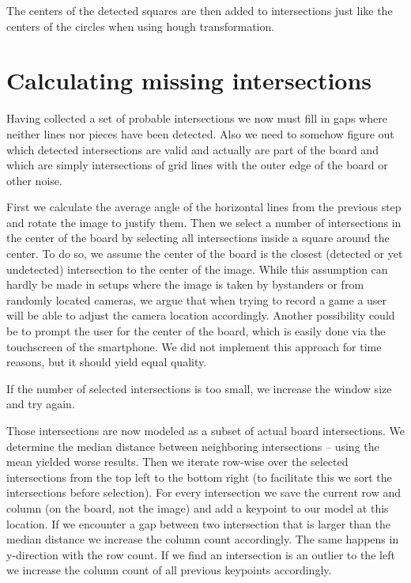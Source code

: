 	The centers of the detected squares are then added to intersections just like the centers of the circles when using hough transformation.

	\section{Calculating missing intersections}
	\label{detector-calculate}
	Having collected a set of probable intersections we now must fill in gaps where neither lines nor pieces have been detected. Also we need to somehow figure out which detected intersections are valid and actually are part of the board and which are simply intersections of grid lines with the outer edge of the board or other noise.

	First we calculate the average angle of the horizontal lines from the previous step and rotate the image to justify them. Then we select a number of intersections in the center of the board by selecting all intersections inside a square around the center. To do so, we assume the center of the board is the closest (detected or yet undetected) intersection to the center of the image. While this assumption can hardly be made in setups where the image is taken by bystanders or from randomly located cameras, we argue that when trying to record a game a user will be able to adjust the camera location accordingly. Another possibility could be to prompt the user for the center of the board, which is easily done via the touchscreen of the smartphone. We did not implement this approach for time reasons, but it should yield equal quality.

	If the number of selected intersections is too small, we increase the window size and try again.

	Those intersections are now modeled as a subset of actual board intersections. We determine the median distance between neighboring intersections -- using the mean yielded worse results. Then we iterate row-wise over the selected intersections from the top left to the bottom right (to facilitate this we sort the intersections before selection). For every intersection we save the current row and column (on the board, not the image) and add a keypoint to our model at this location. If we encounter a gap between two intersection that is larger than the median distance we increase the column count accordingly. The same happens in y-direction with the row count. If we find an intersection is an outlier to the left we increase the column count of all previous keypoints accordingly.

